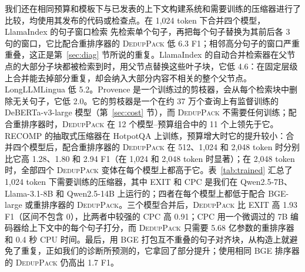 \documentclass[11pt]{article}
\newcommand{\spk}{\textsc{DedupPack}}
\begin{document}
我们还在相同预算和模板下与已发表的上下文构建系统和需要训练的压缩器进行了比较，均使用其发布的代码或检查点。在 1,024 token 下合并四个模型，LlamaIndex 的句子窗口检索 \citep{liu2022llamaindex} 先检索单个句子，再把每个句子替换为其前后各 3 句的窗口，它比配合重排序器的 \spk{} 低 6.3 F1；相邻高分句子的窗口严重重叠，这正是第~\ref{sec:diag} 节所说的重复。LlamaIndex 的自动合并检索器在父节点的大部分子块都被检索到时，用父节点替换这些叶子块，它低 4.6：在固定层级上合并能去掉部分重复，却会纳入大部分内容不相关的整个父节点。LongLLMLingua \citep{jiang2024longllmlingua} 低 5.2。Provence \citep{chirkova2025provence} 是一个训练过的剪枝器，会从每个检索块中删除无关句子，它低 2.0。它的剪枝器是一个在约 37 万个查询上有监督训练的 DeBERTa-v3-large 模型（第~\ref{sec:cost} 节），而 \spk{} 不需要任何训练；配合重排序器时，\spk{} 在 12 个模型--预算组合中的 11 个上领先于它。RECOMP \citep{xu2023recomp} 的抽取式压缩器在 HotpotQA 上训练，预算增大时它的提升较小：合并四个模型后，配合重排序器的 \spk{} 在 512、1,024 和 2,048 token 时分别比它高 1.28、1.80 和 2.94 F1（在 1,024 和 2,048 token 时显著）；在 2,048 token 时，全部四个 \spk{} 变体在每个模型上都高于它。表~\ref{tab:trained} 汇总了 1,024 token 下需要训练的压缩器，其中 EXIT \citep{hwang2025exit} 和 CPC \citep{liskavets2025cpc} 是我们在 Qwen2.5-7B、Llama-3.1-8B 和 Qwen2.5-14B 上运行的；四者在每个模型上都低于配合 BGE-large 或重排序器的 \spk{}。三个模型合并后，\spk{} 比 EXIT 高 1.93 F1（区间不包含 0），比两者中较强的 CPC 高 0.91；CPC 用一个微调过的 7B 编码器给上下文中的每个句子打分，而 \spk{} 只需要 5.68 亿参数的重排序器和 0.4 秒 CPU 时间。最后，用 BGE 打包互不重叠的句子对齐块，从构造上就避免了重复，正如我们的诊断所预测的，它拿回了部分提升；使用相同 BGE 排序器的 \spk{} 仍高出 1.7 F1。
\end{document}
